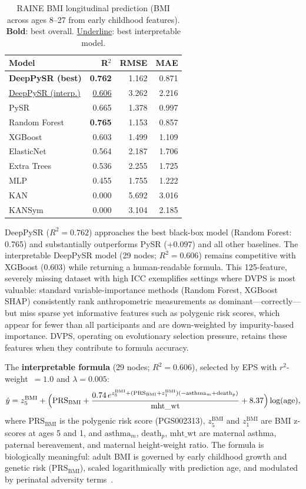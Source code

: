\documentclass[10pt,twocolumn]{article}
\begin{document}
\begin{table}[h]
\centering
\caption{RAINE BMI longitudinal prediction (BMI across ages 8--27 from early
  childhood features).  \textbf{Bold}: best overall.  \underline{Underline}:
  best interpretable model.}
\label{tab:bmi_results}
\begin{tabular}{l rrr}
\toprule
Model & R$^2$ & RMSE & MAE \\
\midrule
\textbf{DeepPySR (best)} & \textbf{0.762} & 1.162 & 0.871 \\
\underline{DeepPySR (interp.)} & \underline{0.606} & 3.262 & 2.216 \\
PySR              & 0.665 & 1.378 & 0.997 \\
\midrule
Random Forest & \textbf{0.765} & 1.153 & 0.857 \\
XGBoost       & 0.603 & 1.499 & 1.109 \\
ElasticNet    & 0.564 & 2.187 & 1.706 \\
Extra Trees   & 0.536 & 2.255 & 1.725 \\
MLP           & 0.455 & 1.755 & 1.222 \\
KAN           & 0.000 & 5.692 & 3.016 \\
KANSym        & 0.000 & 3.104 & 2.185 \\
\bottomrule
\end{tabular}
\end{table}

DeepPySR ($R^2 = 0.762$) approaches the best black-box model (Random Forest:
0.765) and substantially outperforms PySR ($+0.097$) and all other baselines.
The interpretable DeepPySR model (29 nodes; $R^2 = 0.606$) remains competitive
with XGBoost (0.603) while returning a human-readable formula.
This 125-feature, severely missing dataset with high ICC exemplifies settings
where DVPS is most valuable: standard variable-importance methods (Random
Forest, XGBoost SHAP) consistently rank anthropometric measurements as
dominant—correctly—but miss sparse yet informative features such as polygenic
risk scores, which appear for fewer than all participants and are down-weighted
by impurity-based importance.  DVPS, operating on evolutionary selection
pressure, retains these features when they contribute to formula accuracy.

The \textbf{interpretable formula} (29 nodes; $R^2 = 0.606$), selected by EPS
with $r^2$-weight~$= 1.0$ and $\lambda = 0.005$:
\[
  \hat{y} = z_5^{\mathrm{BMI}} + \Bigl(\mathrm{PRS}_{\mathrm{BMI}} +
             \frac{0.74\,e^{z_5^{\mathrm{BMI}} + (\mathrm{PRS}_{\mathrm{BMI}} + z_1^{\mathrm{BMI}})
             (-\mathrm{asthma}_m + \mathrm{death}_p)}}{\mathrm{mht\_wt}}
             + 8.37\Bigr)\log(\mathrm{age}),
\]
where $\mathrm{PRS}_{\mathrm{BMI}}$ is the polygenic risk score (PGS002313),
$z_5^{\mathrm{BMI}}$ and $z_1^{\mathrm{BMI}}$ are BMI z-scores at ages 5 and 1,
and $\mathrm{asthma}_m$, $\mathrm{death}_p$, $\mathrm{mht\_wt}$ are maternal
asthma, paternal bereavement, and maternal height-weight ratio.
The formula is biologically meaningful: adult BMI is governed by early
childhood growth and genetic risk ($\mathrm{PRS}_{\mathrm{BMI}}$), scaled
logarithmically with prediction age, and modulated by perinatal adversity
terms~\citep{warrington2019maternal}.
\end{document}
